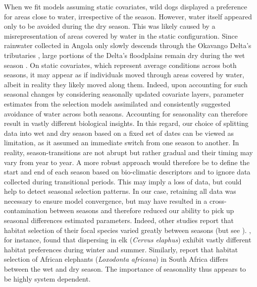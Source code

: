 \documentclass[../FinalThesis.tex]{subfiles}
\begin{document}
When we fit models assuming static covariates, wild dogs displayed a preference
for areas close to water, irrespective of the season. However, water itself
appeared only to be avoided during the dry season. This was likely caused by a
misrepresentation of areas covered by water in the static configuration. Since
rainwater collected in Angola only slowly descends through the Okavango Delta's
tributaries \citep{McCarthy.1997}, large portions of the Delta's floodplains
remain dry during the wet season \citep{McCarthy.2003}. On static covariates,
which represent average conditions across both seasons, it may appear as if
individuals moved through areas covered by water, albeit in reality they likely
moved along them. Indeed, upon accounting for such seasonal changes by
considering seasonally updated covariate layers, parameter estimates from the
selection models assimilated and consistently suggested avoidance of water
across both seasons. Accounting for seasonality can therefore result in vastly
different biological insights. In this regard, our choice of splitting data into
wet and dry season based on a fixed set of dates can be viewed as limitation, as
it assumed an immediate switch from one season to another. In reality,
season-transitions are not abrupt but rather gradual and their timing may vary
from year to year. A more robust approach would therefore be to define the start
and end of each season based on bio-climatic descriptors and to ignore data
collected during transitional periods. This may imply a loss of data, but could
help to detect seasonal selection patterns. In our case, retaining all data was
necessary to ensure model convergence, but may have resulted in a
cross-contamination between seasons and therefore reduced our ability to pick up
seasonal differences estimated parameters. Indeed, other studies report that
habitat selection of their focal species varied greatly between seasons (but see
\citealp{Squires.2013}). \citet{Benz.2016}, for instance, found that dispersing
in elk (\textit{Cervus elaphus}) exhibit vastly different habitat preferences
during winter and summer. Similarly, \citet{Osipova.2019} report that habitat
selection of African elephants (\textit{Loxodonta africana}) in South Africa
differs between the wet and dry season. The importance of seasonality thus
appears to be highly system dependent.

\end{document}

